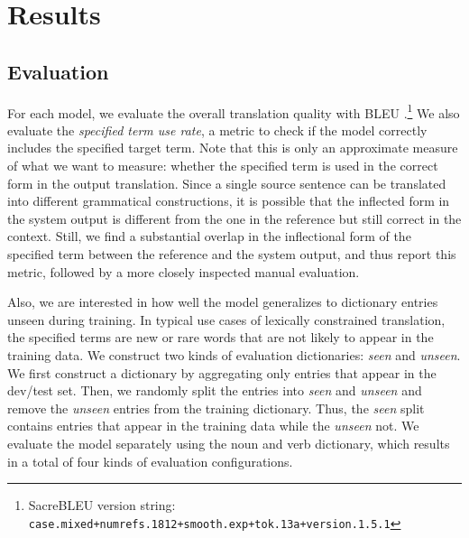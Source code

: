 \section{Results}
\label{sec:results}
\subsection{Evaluation}
For each model, we evaluate the overall translation quality with BLEU \citep{papineni-etal-2002-bleu}.\footnote{SacreBLEU\citep{post-2018-call} version string: \\\texttt{case.mixed+numrefs.1812+smooth.exp+tok.13a+version.1.5.1}}
We also evaluate the {\it specified term use rate}, a metric to check if the model correctly includes the specified target term.
Note that this is only an approximate measure of what we want to measure: whether the specified term is used in the correct form in the output translation.
Since a single source sentence can be translated into different grammatical constructions, it is possible that the inflected form in the system output is different from the one in the reference but still correct in the context.
Still, we find a substantial overlap in the inflectional form of the specified term between the reference and the system output, and thus report this metric, followed by a more closely inspected manual evaluation.

Also, we are interested in how well the model generalizes to dictionary entries unseen during training. In typical use cases of lexically constrained translation, the specified terms are new or rare words that are not likely to appear in the training data. We construct two kinds of evaluation dictionaries: {\it seen} and {\it unseen}.
We first construct a dictionary by aggregating only entries that appear in the dev/test set.
Then, we randomly split the entries into {\it seen} and {\it unseen} and remove the {\it unseen} entries from the training dictionary. Thus, the {\it seen} split contains entries that appear in the training data while the {\it unseen} not.
We evaluate the model separately using the noun and verb dictionary, which results in a total of four kinds of evaluation configurations.

